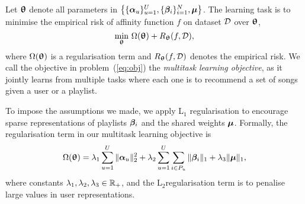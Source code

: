 


Let ${\bm{\uptheta}}$ denote all parameters in $\left\{ \{{\bm{\alpha}}_u\}_{u=1}^U, \{{\bm{\beta}}_i\}_{i=1}^N, \bm{\mu} \right\}$.
The learning task is to minimise the empirical risk of affinity function $f$ on dataset $\mathcal{D}$ over ${\bm{\uptheta}}$,
\ie %
\begin{equation}
\label{eq:obj}
\min_{\bm{\uptheta}} \, \Omega({\bm{\uptheta}}) + R_{\bm{\uptheta}}(f, \mathcal{D}),
\end{equation}
where $\Omega({\bm{\uptheta}})$ is a regularisation term and $R_{\bm{\uptheta}}(f, \mathcal{D})$ denotes the empirical risk.
We call the objective in problem~(\ref{eq:obj}) the {\it multitask learning objective},
as it jointly learns from multiple tasks where each one is to recommend a set of songs given a user or a playlist.


To impose the assumptions we made, we apply L$_1$ regularisation to encourage sparse representations of playlists ${\bm{\beta}}_i$ %
and the shared weights $\bm{\mu}$.
%
Formally, the regularisation term in our multitask learning objective is
\begin{equation}
\label{eq:reg}
\Omega({\bm{\uptheta}}) = \lambda_1 \sum_{u=1}^U \|{\bm{\alpha}}_u\|_2^2 + \lambda_2 \sum_{u=1}^U \sum_{i \in P_u} \|{\bm{\beta}}_i\|_1 + \lambda_3 \| \bm{\mu} \|_1,
\end{equation}
where constants $\lambda_1, \lambda_2, \lambda_3 \in \mathbb{R}_+$,
and the L$_2$regularisation term is to penalise large values in user representations.

